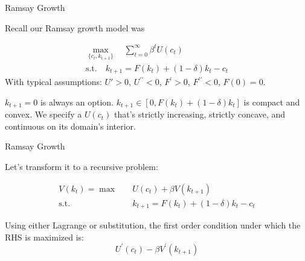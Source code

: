 \documentclass[11pt, xcolor={dvipsnames}, hyperref={colorlinks, allcolors=Blue}]{beamer}
\begin{document}
\begin{frame}{Ramsay Growth}

Recall our Ramsay growth model was 

\begin{gather*}
\underset{\{c_{t}, k_{t+1}\}}{\max} \quad \sum_{t=0}^{\infty} \beta^{t} U(c_{t})\\
\text{s.t.} \quad k_{t+1} = F(k_{t}) + (1-\delta)k_{t} - c_{t}
\end{gather*}
\bigskip
With typical assumptions: $U\prime > 0$, $U^{\prime\prime} < 0$, $F^{\prime} > 0$, $F^{\prime\prime} < 0$, $F(0) = 0$.\bigskip

$k_{t+1} = 0$ is always an option. $k_{t+1} \in [0, F(k_{t}) + (1-\delta)k_{t}]$ is compact and convex. We specify a $U(c_{t})$ that's strictly increasing, strictly concave, and continuous on its domain's interior.

\end{frame}

\begin{frame}{Ramsay Growth}

Let's transform it to a recursive problem:

\begin{align*}
V(k_{t}) = \max& \quad U(c_{t}) + \beta V(k_{t+1})\\
\text{s.t.} & \quad k_{t+1} = F(k_{t}) + (1-\delta)k_{t} - c_{t}
\end{align*}
\bigskip

Using either Lagrange or substitution, the first order condition under which the RHS is maximized is:
\[U^{\prime}(c_{t}) - \beta V^{\prime}(k_{t+1})\]
\bigskip
\end{frame}
\end{document}
